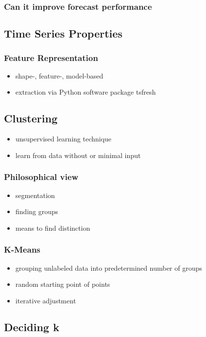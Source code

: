 \documentclass[11pt]{article}
\begin{document}
\subsubsection*{Can it improve forecast performance}
\label{sec:org65bbf95}
\subsection*{Time Series  Properties}
\label{sec:orgcd83e92}
\subsubsection*{Feature Representation}
\label{sec:org3d565d8}
\begin{itemize}
\item shape-, feature-, model-based
\item extraction via Python software package tsfresh
\end{itemize}
\subsection*{Clustering}
\label{sec:org8dee5f5}
\begin{itemize}
\item unsupervised learning technique
\item learn from data without or minimal input
\end{itemize}
\subsubsection*{Philosophical view}
\label{sec:orgbc23086}
\begin{itemize}
\item segmentation
\item finding groups
\item means to find distinction
\end{itemize}
\subsubsection*{K-Means}
\label{sec:orge20e0b0}
\begin{itemize}
\item grouping unlabeled data into predetermined number of groups
\item random starting point of points
\item iterative adjustment
\end{itemize}
\subsection*{Deciding k}
\label{sec:orgafdd5ac}
\end{document}

